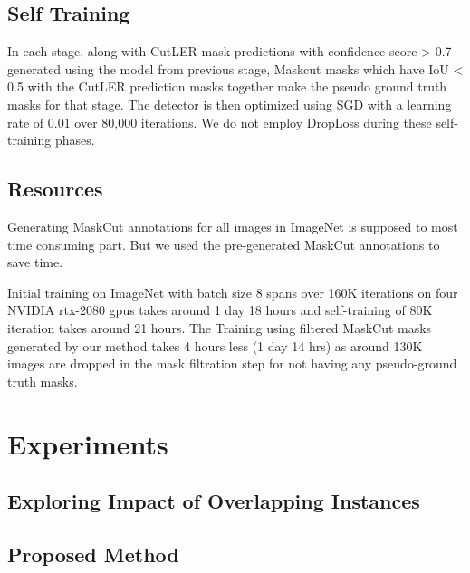 \subsection{Self Training}
In each stage, along with CutLER mask predictions with confidence score > 0.7 generated using the model from previous stage, Maskcut masks which have IoU < 0.5 with the CutLER prediction masks together make the pseudo ground truth masks for that stage. The detector is then optimized using SGD with a learning rate of 0.01 over 80,000 iterations. We do not employ DropLoss during these self-training phases.

\subsection{Resources}
Generating MaskCut annotations for all images in ImageNet is supposed to most time consuming part. But we used the pre-generated MaskCut annotations to save time.

Initial training on ImageNet with batch size 8 spans over 160K iterations on four NVIDIA rtx-2080 gpus takes around 1 day 18 hours and self-training of 80K iteration takes around 21 hours. The Training using filtered MaskCut masks generated by our method takes 4 hours less (1 day 14 hrs) as around 130K images are dropped in the mask filtration step for not having any pseudo-ground truth masks.


\section{Experiments}
\subsection{Exploring Impact of Overlapping Instances}

\subsection{Proposed Method}

